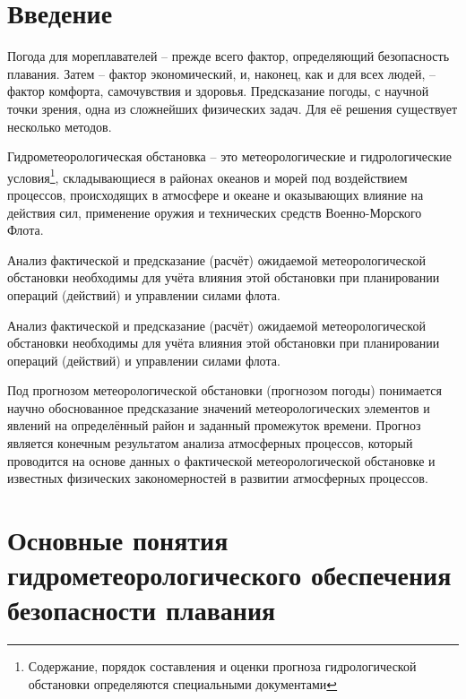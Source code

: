 \documentclass[a4paper, 12pt, twoside, final, book, russian, fittopage, cyremdash, openright]{ncc}
\begin{document}


\frontmatter

{\small \tableofcontents}
{\small \listoffigures}
{\small \listoftables}

\openrightorany

\chapter*{Введение}

Погода для мореплавателей \--- прежде всего фактор, определяющий
безопасность плавания. Затем \--- фактор экономический, и, наконец,
как и для всех людей, \--- фактор комфорта, самочувствия и
здоровья. Предсказание погоды, с научной точки зрения, одна из
сложнейших физических задач. Для её решения существует несколько
методов.

Гидрометеорологическая обстановка \--- это метеорологические и
гидрологические условия\footnote{Содержание, порядок составления и
  оценки прогноза гидрологической обстановки определяются специальными
  документами}, складывающиеся в районах океанов и морей под
воздействием процессов, происходящих в атмосфере и океане и
оказывающих влияние на действия сил, применение оружия и технических
средств Военно-Морского Флота.

Анализ фактической и предсказание (расчёт) ожидаемой метеорологической
обстановки необходимы для учёта влияния этой обстановки при
планировании операций (действий) и управлении силами флота.

Анализ фактической и предсказание (расчёт) ожидаемой метеорологической
обстановки необходимы для учёта влияния этой обстановки при
планировании операций (действий) и управлении силами флота.

Под прогнозом метеорологической обстановки (прогнозом погоды)
понимается научно обоснованное предсказание значений метеорологических
элементов и явлений на определённый район и заданный промежуток
времени. Прогноз является конечным результатом анализа атмосферных
процессов, который проводится на основе данных о фактической
метеорологической обстановке и известных физических закономерностей в
развитии атмосферных процессов.

\mainmatter

\chapter{Основные понятия гидрометеорологического обеспечения безопасности плавания}
\end{document}
